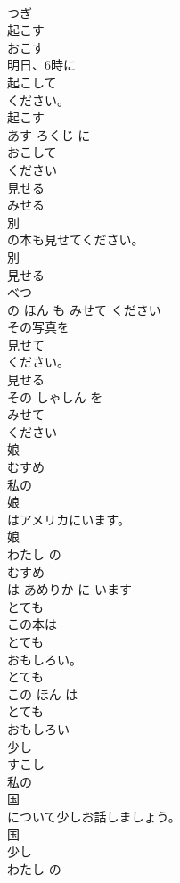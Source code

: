 \documentclass[8pt]{extreport}
\begin{document}
\begin{CJK}{UTF8}{min}
\\	つぎ	
\\	起こす	
\\	おこす	
\\	明日、6時に
\\	起こして
\\	ください。	
\\	起こす 
\\	あす ろくじ に 
\\	おこして
\\	ください	
\\	見せる	
\\	みせる	
\\	別
\\	の本も見せてください。	
\\	別 
\\	見せる 
\\	べつ
\\	の ほん も みせて ください	
\\	その写真を
\\	見せて
\\	ください。	
\\	見せる 
\\	その しゃしん を 
\\	みせて
\\	ください	
\\	娘	
\\	むすめ	
\\	私の
\\	娘
\\	はアメリカにいます。	
\\	娘 
\\	わたし の 
\\	むすめ
\\	は あめりか に います	
\\	とても	
\\	この本は
\\	とても
\\	おもしろい。	
\\	とても 
\\	この ほん は 
\\	とても
\\	おもしろい	
\\	少し	
\\	すこし	
\\	私の
\\	国
\\	について少しお話しましょう。	
\\	国 
\\	少し 
\\	わたし の 

\end{CJK}
\end{document}

